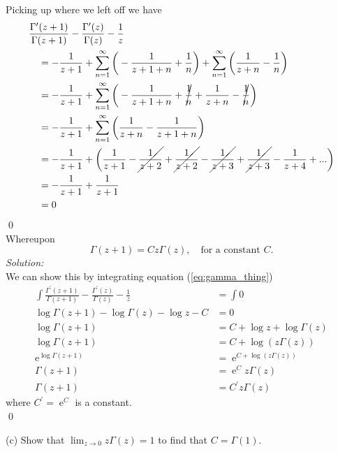 \documentclass[10pt]{amsart}
\DeclareMathOperator{\E}{e}
\theoremstyle{nonumberplain}
\begin{document}
\begin{enumerate}[label={\bf {\arabic*}:}]
\noindent
Picking up where we left off we have
\begin{align*}
&\frac {\Gamma^\prime(z + 1)} {\Gamma(z + 1)} - \frac {\Gamma^\prime(z)} {\Gamma(z)} - \frac 1 z \\
	& \quad = - \frac 1 {z + 1} + \sum_{n=1}^\infty \bigg( - \frac 1 {z + 1 + n} + \frac 1 n \bigg) + \sum_{n=1}^\infty \bigg( \frac 1 {z + n} - \frac 1 n \bigg) \\
	& \quad = - \frac 1 {z + 1} + \sum_{n=1}^\infty \bigg( - \frac 1 {z + 1 + n} + \cancel{\frac 1 n} + \frac 1 {z + n} - \cancel{\frac 1 n} \bigg) \\
	& \quad = - \frac 1 {z + 1} + \sum_{n=1}^\infty \bigg(\frac 1 {z + n}  - \frac 1 {z + 1 + n} \bigg) \\
	& \quad = - \frac 1 {z + 1} + \bigg(\frac 1 {z + 1}  - \cancel{\frac 1 {z + 2}} + \cancel{\frac 1 {z + 2}}  - \cancel{\frac 1 {z + 3}} + \cancel{\frac 1 {z + 3}}  - \frac 1 {z + 4} + ... \bigg) \\
	& \quad = - \frac 1 {z + 1} + \frac 1 {z + 1} \\
	& \quad = 0
\end{align*}
\qed \\
Whereupon
$$ \Gamma(z + 1) = Cz\Gamma(z), \quad \text{for a constant $C$}. $$
\textit{Solution:} \\
We can show this by integrating equation (\ref{eq:gamma_thing})
\begin{align*}
\int \frac {\Gamma^\prime(z + 1)} {\Gamma(z + 1)} - \frac {\Gamma^\prime(z)} {\Gamma(z)} - \frac 1 z &= \int 0 \\
\log \Gamma(z + 1) - \log {\Gamma(z)} - \log z - C &= 0 \\
\log \Gamma(z + 1) &= C + \log z + \log {\Gamma(z)} \\
\log \Gamma(z + 1) &= C + \log (z{\Gamma(z)}) \\
\E^{\log \Gamma(z + 1)} &= \E^{C + \log (z{\Gamma(z)})} \\
\Gamma(z + 1) &= \E^C z\Gamma(z) \\
\Gamma(z + 1) &= C^\prime z\Gamma(z)
\end{align*}
where $C^\prime = \E^C$ is a constant. \\
\qed \\
\newpage

\noindent
(c) Show that $\lim_{z\rightarrow 0} z \Gamma(z) = 1$ to find that $C = \Gamma(1)$. \\


\end{enumerate}
\end{document}
